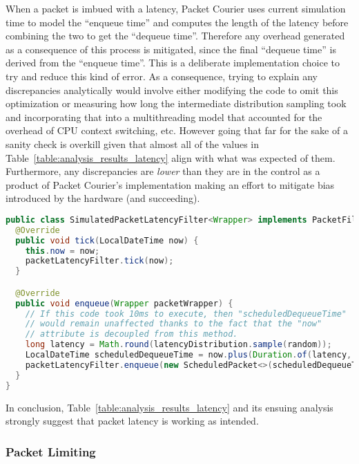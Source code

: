 When a packet is imbued with a latency, Packet Courier uses current simulation time to model the ``enqueue time'' and
computes the length of the latency before combining the two to get the ``dequeue time''. Therefore any overhead
generated as a consequence of this process is mitigated, since the final ``dequeue time'' is derived from the
``enqueue time''. This is a deliberate implementation choice to try and reduce this kind of error. As a consequence,
trying to explain any discrepancies analytically would involve either modifying the code to omit this optimization or
measuring how long the intermediate distribution sampling took and incorporating that into a multithreading model
that accounted for the overhead of CPU context switching, etc. However going that far for the sake of a sanity check
is overkill given that almost all of the values in Table~\ref{table:analysis_results_latency} align with what was
expected of them. Furthermore, any discrepancies are \emph{lower} than they are in the control as a product of Packet
Courier's implementation making an effort to mitigate bias introduced by the hardware (and succeeding).

\begin{lstlisting}[language=Java,caption={A cut-down version of the \texttt{SimulatedPacketLatencyFilter<Wrapper>}
class.},label={code:simulated_latency_enqueue_method},captionpos=b]
public class SimulatedPacketLatencyFilter<Wrapper> implements PacketFilter<Wrapper> {
  @Override
  public void tick(LocalDateTime now) {
    this.now = now;
    packetLatencyFilter.tick(now);
  }

  @Override
  public void enqueue(Wrapper packetWrapper) {
    // If this code took 10ms to execute, then "scheduledDequeueTime"
    // would remain unaffected thanks to the fact that the "now"
    // attribute is decoupled from this method.
    long latency = Math.round(latencyDistribution.sample(random));
    LocalDateTime scheduledDequeueTime = now.plus(Duration.of(latency, timeUnit));
    packetLatencyFilter.enqueue(new ScheduledPacket<>(scheduledDequeueTime, packetWrapper));
  }
}
\end{lstlisting}

In conclusion, Table~\ref{table:analysis_results_latency} and its ensuing analysis strongly suggest that packet
latency is working as intended.

\subsubsection{Packet Limiting}\label{subsubsection:limit_analysis}


